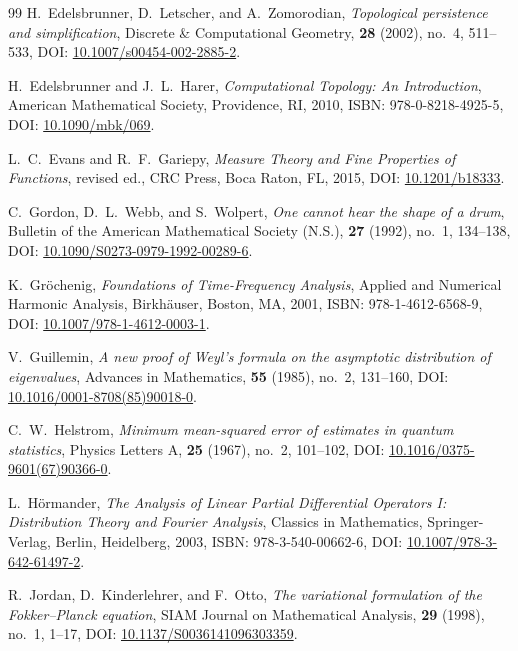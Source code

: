 \documentclass[11pt,a4paper,reqno]{amsart}
\theoremstyle{definition}
\numberwithin{equation}{section}
\begin{document}
\begin{thebibliography}{99}
H.~Edelsbrunner, D.~Letscher, and A.~Zomorodian,
\emph{Topological persistence and simplification},
Discrete \& Computational Geometry, \textbf{28} (2002), no.~4, 511--533, DOI: \href{https://doi.org/10.1007/s00454-002-2885-2}{10.1007/s00454-002-2885-2}.

H.~Edelsbrunner and J.~L.~Harer,
\emph{Computational Topology: An Introduction},
American Mathematical Society, Providence, RI, 2010, ISBN: 978-0-8218-4925-5, DOI: \href{https://doi.org/10.1090/mbk/069}{10.1090/mbk/069}.

L.~C.~Evans and R.~F.~Gariepy,
\emph{Measure Theory and Fine Properties of Functions},
revised ed., CRC Press, Boca Raton, FL, 2015, DOI: \href{https://doi.org/10.1201/b18333}{10.1201/b18333}.

C.~Gordon, D.~L.~Webb, and S.~Wolpert,
\emph{One cannot hear the shape of a drum},
Bulletin of the American Mathematical Society (N.S.), \textbf{27} (1992), no.~1, 134--138, DOI: \href{https://doi.org/10.1090/S0273-0979-1992-00289-6}{10.1090/S0273-0979-1992-00289-6}.

K.~Gr{\"o}chenig,
\emph{Foundations of Time-Frequency Analysis},
Applied and Numerical Harmonic Analysis, Birkh{\"a}user, Boston, MA, 2001, ISBN: 978-1-4612-6568-9, DOI: \href{https://doi.org/10.1007/978-1-4612-0003-1}{10.1007/978-1-4612-0003-1}.

V.~Guillemin,
\emph{A new proof of Weyl's formula on the asymptotic distribution of eigenvalues},
Advances in Mathematics, \textbf{55} (1985), no.~2, 131--160, DOI: \href{https://doi.org/10.1016/0001-8708(85)90018-0}{10.1016/0001-8708(85)90018-0}.

C.~W.~Helstrom,
\emph{Minimum mean-squared error of estimates in quantum statistics},
Physics Letters A, \textbf{25} (1967), no.~2, 101--102, DOI: \href{https://doi.org/10.1016/0375-9601(67)90366-0}{10.1016/0375-9601(67)90366-0}.

L.~H{\"o}rmander,
\emph{The Analysis of Linear Partial Differential Operators I: Distribution Theory and Fourier Analysis},
Classics in Mathematics, Springer-Verlag, Berlin, Heidelberg, 2003, ISBN: 978-3-540-00662-6, DOI: \href{https://doi.org/10.1007/978-3-642-61497-2}{10.1007/978-3-642-61497-2}.

R.~Jordan, D.~Kinderlehrer, and F.~Otto,
\emph{The variational formulation of the Fokker--Planck equation},
SIAM Journal on Mathematical Analysis, \textbf{29} (1998), no.~1, 1--17, DOI: \href{https://doi.org/10.1137/S0036141096303359}{10.1137/S0036141096303359}.


\end{thebibliography}
\end{document}
